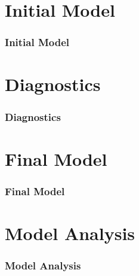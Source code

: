 \documentclass[11pt]{beamer}
\begin{document}
\section{Initial Model}
\begin{frame}
\frametitle{{\textbf{\huge Initial Model}}}
\end{frame}
\section{Diagnostics}
\begin{frame}
\frametitle{{\textbf{\huge Diagnostics}}}
\end{frame}
\section{Final Model}
\begin{frame}
\frametitle{{\textbf{\huge Final Model}}}
\end{frame}
\section{Model Analysis}
\begin{frame}
\frametitle{{\textbf{\huge Model Analysis}}}
\end{frame}
\end{document}
